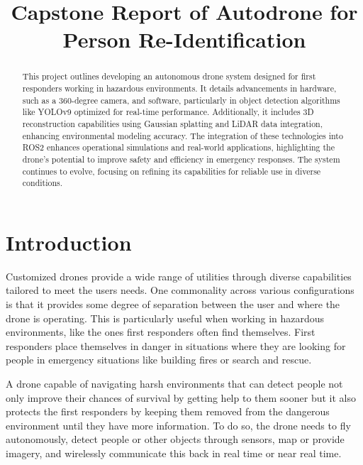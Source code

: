 \documentclass[conference]{IEEEtran}
\begin{document}
\title{Capstone Report of Autodrone for Person Re-Identification\\

}

\author{

}


\maketitle

\begin{abstract}

This project outlines developing an autonomous drone system designed for first responders working in hazardous environments. It details advancements in hardware, such as a 360-degree camera, and software, particularly in object detection algorithms like YOLOv9 optimized for real-time performance. Additionally, it includes 3D reconstruction capabilities using Gaussian splatting and LiDAR data integration, enhancing environmental modeling accuracy. The integration of these technologies into ROS2 enhances operational simulations and real-world applications, highlighting the drone's potential to improve safety and efficiency in emergency responses. The system continues to evolve, focusing on refining its capabilities for reliable use in diverse conditions.
\end{abstract}


\section{Introduction}
Customized drones provide a wide range of utilities through diverse capabilities tailored to meet the users needs. One commonality across various configurations is that it provides some degree of separation between the user and where the drone is operating. This is particularly useful when working in hazardous environments, like the ones first responders often find themselves. First responders place themselves in danger in situations where they are looking for people in emergency situations like building fires or search and rescue. 

A drone capable of navigating harsh environments that can detect people not only improve their chances of survival by getting help to them sooner but it also protects the first responders by keeping them removed from the dangerous environment until they have more information. To do so, the drone needs to fly autonomously, detect people or other objects through sensors, map or provide imagery, and wirelessly communicate this back in real time or near real time. 
\end{document}
